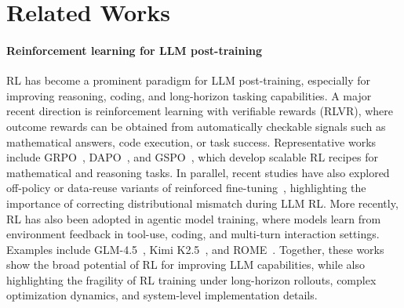 \section{Related Works}
\label{sec:related_works}

\paragraph{Reinforcement learning for LLM post-training}
RL has become a prominent paradigm for LLM post-training, especially for improving reasoning, coding, and long-horizon tasking capabilities.
A major recent direction is reinforcement learning with verifiable rewards (RLVR), where outcome rewards can be obtained from automatically checkable signals such as mathematical answers, code execution, or task success.
Representative works include GRPO~\citep{Shao24GRPO}, DAPO~\citep{Yu2025DAPO}, and GSPO~\citep{gspo}, which develop scalable RL recipes for mathematical and reasoning tasks.
In parallel, recent studies have also explored off-policy or data-reuse variants of reinforced fine-tuning~\citep{remix,zhan2026exgrpo}, highlighting the importance of correcting distributional mismatch during LLM RL.
More recently, RL has also been adopted in agentic model training, where models learn from environment feedback in tool-use, coding, and multi-turn interaction settings.
Examples include GLM-4.5~\citep{glm}, Kimi K2.5~\citep{kimiteam2026kimik25visualagentic}, and ROME~\citep{ROME}.
Together, these works show the broad potential of RL for improving LLM capabilities, while also highlighting the fragility of RL training under long-horizon rollouts, complex optimization dynamics, and system-level implementation details.

\vspace{-0.2cm}
